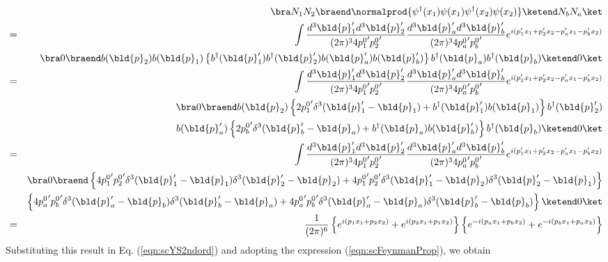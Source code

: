 \begin{eqnarray}
&&\bra N_1 N_2 \braend
\normalprod{
\psi^\dagger(x_1) \psi(x_1) 
\psi^\dagger(x_2) \psi(x_2)
}
\ketend N_b N_a \ket
\nonumber\\
&=&
\int \frac{d^3 \bld{p}_1' d^3 \bld{p}_2'}{(2\pi)^3 4 {p_1^0}' {p_2^0}'} 
 \frac{d^3 \bld{p}_a' d^3 \bld{p}_b'}{(2\pi)^3 4 {p_a^0}' {p_b^0}'} 
 e^{i(p_1' x_1 + p_2' x_2 - p_a' x_1 - p_b' x_2)}
\nonumber\\
&&
 \bra 0 \braend 
 b(\bld{p}_2)  b(\bld{p}_1) \left\{
 b^\dagger(\bld{p}_1') b^\dagger(\bld{p}_2')
b(\bld{p}_a') b(\bld{p}_b')
\right\}
 b^\dagger(\bld{p}_a) b^\dagger(\bld{p}_b)
 \ketend 0 \ket
\nonumber\\
&=&
\int \frac{d^3 \bld{p}_1' d^3 \bld{p}_2'}{(2\pi)^3 4 {p_1^0}' {p_2^0}'} 
 \frac{d^3 \bld{p}_a' d^3 \bld{p}_b'}{(2\pi)^3 4 {p_a^0}' {p_b^0}'} 
 e^{i(p_1' x_1 + p_2' x_2 - p_a' x_1 - p_b' x_2)}
\nonumber\\
&&
\bra 0 \braend 
 b(\bld{p}_2)  \left\{
 2{p_1^0}' \delta^3(\bld{p}_1' - \bld{p}_1) 
 + b^\dagger({\bld{p}_1'}) b({\bld{p}_1})
 \right\}
 b^\dagger({\bld{p}_2'})
 \nonumber\\
 &&
  b(\bld{p}_a')   \left\{
 2{p_b^0}' \delta^3(\bld{p}_b' - \bld{p}_a) 
 + b^\dagger({\bld{p}_a}) b({\bld{p}_b'})
  \right\}
  b^\dagger({\bld{p}_b})
   \ketend 0 \ket
\nonumber\\
&=&
\int \frac{d^3 \bld{p}_1' d^3 \bld{p}_2'}{(2\pi)^3 4 {p_1^0}' {p_2^0}'} 
 \frac{d^3 \bld{p}_a' d^3 \bld{p}_b'}{(2\pi)^3 4 {p_a^0}' {p_b^0}'} 
 e^{i(p_1' x_1 + p_2' x_2 - p_a' x_1 - p_b' x_2)}
\nonumber\\
&&
\bra 0 \braend 
\left\{
4{p_1^0}' {p_2^0}' \delta^3(\bld{p}_1' - \bld{p}_1) \delta^3(\bld{p}_2' - \bld{p}_2) 
+
4{p_1^0}' {p_2^0}' \delta^3(\bld{p}_1' - \bld{p}_2) \delta^3(\bld{p}_2' - \bld{p}_1) 
\right\}
\nonumber\\
&&
\left\{
4{p_a^0}' {p_b^0}' \delta^3(\bld{p}_a' - \bld{p}_b) \delta^3(\bld{p}_b' - \bld{p}_a) 
+
4{p_a^0}' {p_b^0}' \delta^3(\bld{p}_a' - \bld{p}_a) \delta^3(\bld{p}_b' - \bld{p}_b) 
\right\}
\ketend 0 \ket
\nonumber\\
&=&
\frac{1}{(2\pi)^6}
\left\{
e^{i(p_1 x_1 + p_2 x_2)} + e^{i(p_2 x_1 + p_1 x_2)}
\right\}
\left\{
e^{-i(p_a x_1 + p_b x_2)} + e^{-i(p_b x_1 + p_a x_2)}
\right\}
\nonumber
\end{eqnarray}
Substituting this result in Eq. (\ref{eqn:scYS2ndord}) and 
adopting the expression (\ref{eqn:scFeynmanProp}),
we obtain
